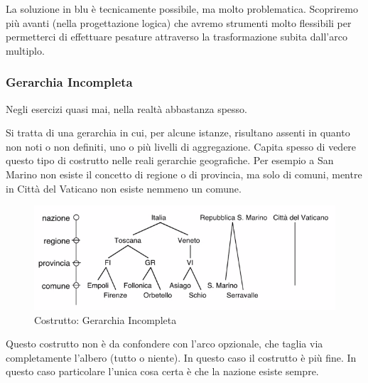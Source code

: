 \begin{info}[Morale:]
	La soluzione in blu è tecnicamente possibile, ma molto problematica.
	Scopriremo più avanti (nella progettazione logica) che avremo strumenti molto flessibili per permetterci di effettuare pesature attraverso la trasformazione subita dall'arco multiplo.
\end{info}
\subsubsection{Gerarchia Incompleta}
\begin{info}
	Negli esercizi quasi mai, nella realtà abbastanza spesso.
\end{info}
Si tratta di una gerarchia in cui, per alcune istanze, risultano assenti in quanto non noti o non definiti, uno o più livelli di aggregazione.\newline
Capita spesso di vedere questo tipo di costrutto nelle reali gerarchie geografiche. Per esempio a San Marino non esiste il concetto di regione o di provincia, ma solo di comuni, mentre in Città del Vaticano non esiste nemmeno un comune.
\begin{figure}[H]
	\begin{center}
		\includegraphics[width=0.9\linewidth]{img/incoml.PNG}
		\caption{Costrutto: Gerarchia Incompleta}
	\end{center}
\end{figure}
\noindent Questo costrutto non è da confondere con l'arco opzionale, che taglia via completamente l'albero (tutto o niente). In questo caso il costrutto è più fine. In questo caso particolare l'unica cosa certa è che la nazione esiste sempre.
